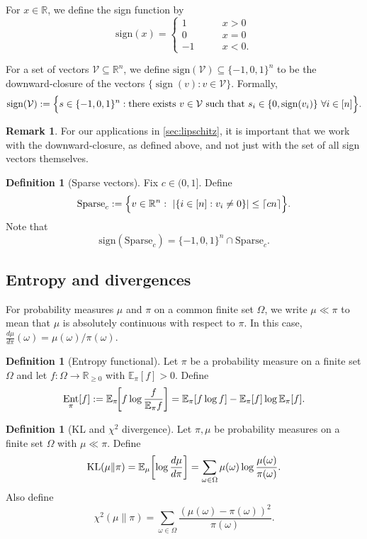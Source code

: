 \documentclass[11pt,reqno,letterpaper]{amsart}
\numberwithin{equation}{section}
\theoremstyle{definition}
\newtheorem{definition}[theorem]{Definition}
\newtheorem{remark}[theorem]{Remark}
\newcommand{\mb}{\mathbb}
\newcommand{\mc}{\mathcal}
\newcommand{\on}{\operatorname}
\DeclareMathOperator{\Ent}{Ent}
\newcommand{\KL}{\operatorname{KL}}
\let\originalleft\left
\let\originalright\right
\renewcommand{\left}{\mathopen{}\mathclose\bgroup\originalleft}
\renewcommand{\right}{\aftergroup\egroup\originalright}
\begin{document}
For $x \in \mb{R}$, we define the sign function by
\[\mathrm{sign}(x) = 
\begin{cases}
    1 \qquad & x > 0\\
    0 \qquad & x = 0\\
    -1 \qquad & x < 0.
\end{cases}
\]

For a set of vectors $\mc{V}\subseteq \mb{R}^n$, we define $\mathrm{sign}(\mathcal{V}) \subseteq \{-1,0,1\}^n$ to be the downward-closure of the vectors $\{\on{sign}(v): v \in \mc{V}\}$. Formally,
\begin{equation}
\mathrm{sign}(\mathcal{V})
:=
\Bigl\{s \in \{-1,0,1\}^{n}: \text{there exists } v \in \mc{V} \text{ such that } s_i \in \{0,\on{sign}(v_i)\}\ \forall i\in[n]\Bigr\}.
\end{equation}
\begin{remark}
    For our applications in \cref{sec:lipschitz}, it is important that we work with the downward-closure, as defined above, and not just with the set of all sign vectors themselves. 
\end{remark}

\begin{definition}[Sparse vectors]\label{def:sparse}
Fix $c\in(0,1]$.
Define
\[
\mathrm{Sparse}_c := \Bigl\{v\in\mathbb{R}^n:\ |\{i\in[n]: v_i\neq 0\}|\le \lceil cn \rceil\Bigr\}.
\]
Note that
\[
\mathrm{sign}(\mathrm{Sparse}_c)=\{-1,0,1\}^n\cap \mathrm{Sparse}_c.
\]
\end{definition}


\subsection{Entropy and divergences}\label{subsec:entropy}

For probability measures $\mu$ and $\pi$ on a common finite set $\Omega$, we write $\mu \ll \pi$ to mean that
$\mu$ is absolutely continuous with respect to $\pi$. In this case, $\frac{d\mu}{d\pi}(\omega)=\mu(\omega)/\pi(\omega)$.

\begin{definition}[Entropy functional]
Let $\pi$ be a probability measure on a finite set $\Omega$ and let $f:\Omega\to\mathbb{R}_{\ge 0}$ with $\mathbb{E}_\pi[f]>0$.
Define
\[
\Ent_\pi[f]
:=
\mathbb{E}_\pi\!\left[f\log\frac{f}{\mathbb{E}_\pi f}\right]
=
\mathbb{E}_\pi[f\log f]-\mathbb{E}_\pi[f]\log\mathbb{E}_\pi[f].
\]
\end{definition}

\begin{definition}[KL and $\chi^2$ divergence]
Let $\pi,\mu$ be probability measures on a finite set $\Omega$ with $\mu\ll \pi$. Define
\[
\KL(\mu \| \pi) = \mathbb{E}_{\mu}\left[\log \frac{d\mu}{d\pi}\right]
=\sum_{\omega\in\Omega} \mu(\omega)\log\frac{\mu(\omega)}{\pi(\omega)}.
\]
Also define
\[
\chi^2(\mu\| \pi) = \sum_{\omega \in \Omega} \frac{(\mu(\omega) - \pi(\omega))^2}{\pi(\omega)}.
\]
\end{definition}
\end{document}
